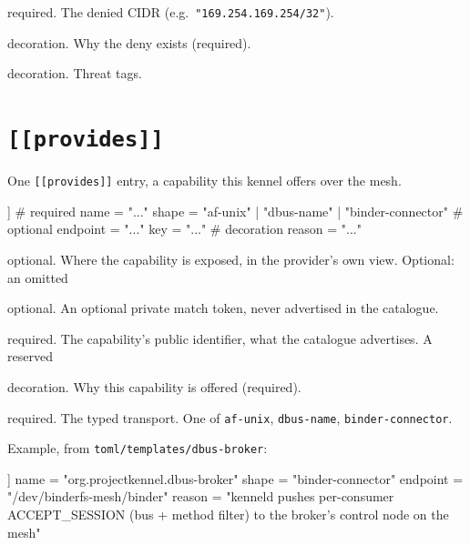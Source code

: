 \begin{description}
\tightlist
\item[\texttt{cidr}]
required. The denied CIDR (e.g.~\texttt{"169.254.169.254/32"}).
\item[\texttt{reason}]
decoration. Why the deny exists (required).
\item[\texttt{threats}]
decoration. Threat tags.
\end{description}

\hypertarget{provides}{%
\section{\texorpdfstring{\texttt{{[}{[}provides{]}{]}}}{{[}{[}provides{]}{]}}}\label{provides}}

One \texttt{{[}{[}provides{]}{]}} entry, a capability this kennel offers
over the mesh.

\begin{kennelcode}
[[provides]]
# required
name     = "..."
shape    = "af-unix" | "dbus-name" | "binder-connector"
# optional
endpoint = "..."
key      = "..."
# decoration
reason   = "..."
\end{kennelcode}

\begin{description}
\tightlist
\item[\texttt{endpoint}]
optional. Where the capability is exposed, in the provider's own view.
Optional: an omitted
\item[\texttt{key}]
optional. An optional private match token, never advertised in the
catalogue.
\item[\texttt{name}]
required. The capability's public identifier, what the catalogue
advertises. A reserved
\item[\texttt{reason}]
decoration. Why this capability is offered (required).
\item[\texttt{shape}]
required. The typed transport. One of \texttt{af-unix},
\texttt{dbus-name}, \texttt{binder-connector}.
\end{description}

Example, from \texttt{toml/templates/dbus-broker}:

\begin{kennelcode}
[[provides]]
name = "org.projectkennel.dbus-broker"
shape = "binder-connector"
endpoint = "/dev/binderfs-mesh/binder"
reason = "kenneld pushes per-consumer ACCEPT_SESSION (bus + method filter) to the broker's control node on the mesh"
\end{kennelcode}

